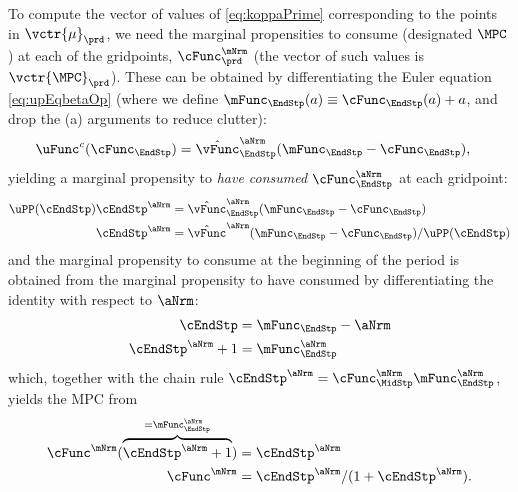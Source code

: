 \documentclass[\econtexRoot/SolvingMicroDSOPs]{subfiles}
\begin{document}
To compute the vector of values of \eqref{eq:koppaPrime} corresponding
to the points in $\vctr{\mu}_{\prd}$, we need the marginal propensities to
consume (designated $\MPC$) at each of the gridpoints,
$\cFunc^{\mNrm}_{\prd}$ (the vector of such values is
$\vctr{\MPC}_{\prd}$).  These can be obtained by differentiating the
Euler equation \eqref{eq:upEqbetaOp} (where we define
$\mFunc_{\EndStp}({a}) \equiv \cFunc_{\EndStp}({a})+{a}$, and drop the (a) arguments to reduce clutter):
\begin{equation}\begin{gathered}\begin{aligned}
      \uFunc^{{c}}({\cFunc}_{\EndStp})   & = \hat{\vFunc}_{\EndStp}^{\aNrm}(\mFunc_{\EndStp}-{\cFunc}_{\EndStp}),
    \end{aligned}\end{gathered}\end{equation}
yielding a marginal propensity to
\textit{have consumed} $\cFunc_{\EndStp}^{\aNrm}$ at each gridpoint:
\begin{equation}\begin{gathered}\begin{aligned}
      \uPP(\cEndStp)\cEndStp^{\aNrm}  & = \hat{\vFunc}_{\EndStp}^{\aNrm}(\mFunc_{\EndStp}-{\cFunc}_{\EndStp})
      \\ \cEndStp^{\aNrm}  & = \hat{\vFunc}^{\aNrm}(\mFunc_{\EndStp}-{\cFunc}_{\EndStp})/\uPP(\cEndStp)
    \end{aligned}\end{gathered}\end{equation}
and the marginal propensity to consume at the beginning of the period is obtained from the marginal propensity to have consumed by differentiating the identity with respect to $\aNrm$:
\begin{equation*}\begin{gathered}\begin{aligned}
      \cEndStp  & = \mFunc_{\EndStp} - \aNrm
      \\ \cEndStp^{\aNrm}+1  & = \mFunc_{\EndStp}^{\aNrm}
    \end{aligned}\end{gathered}\end{equation*}
which, together with the chain rule $\cEndStp^{\aNrm}  = \cFunc^{\mNrm}_{\MidStp}\mFunc_{\EndStp}^{\aNrm}$, yields the MPC from
\begin{equation}\begin{gathered}\begin{aligned}
      \cFunc^{\mNrm}(\overbrace{\cEndStp^{\aNrm}+1}^{=\mFunc_{\EndStp}^{\aNrm}})  & = \cEndStp^{\aNrm}
      \\ \cFunc^{\mNrm}  & = \cEndStp^{\aNrm}/(1+\cEndStp^{\aNrm}) \label{eq:MPCfromMPTHC}.
    \end{aligned}\end{gathered}\end{equation}
\end{document}
